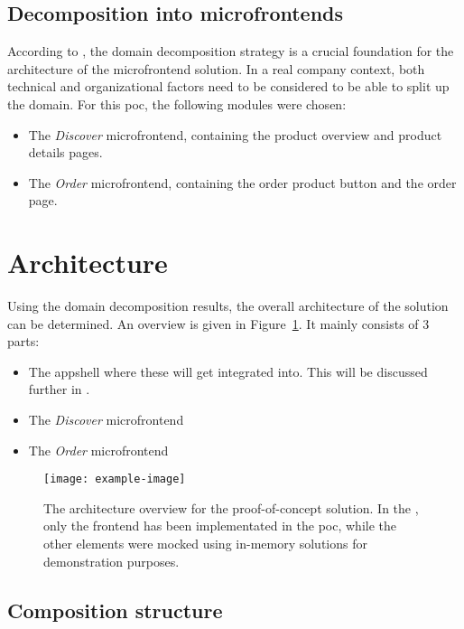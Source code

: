 \subsection{Decomposition into microfrontends}

According to \textcite{Rappl_2021}, the domain decomposition strategy is a
crucial foundation for the architecture of the \gls{microfrontend} solution. In
a real company context, both technical and organizational factors need to be
considered to be able to split up the domain. For this \gls{poc}, the following
modules were chosen:

\begin{itemize}
  \item The \textit{Discover} \gls{microfrontend}, containing the product
  overview and product details pages.
  \item The \textit{Order} \gls{microfrontend}, containing the order product
  button and the order page.
\end{itemize}

\section{Architecture}

Using the domain decomposition results, the overall architecture of the solution
can be determined. An overview is given in Figure~\ref{fig:poc-architecture}. It
mainly consists of 3 parts:
\begin{itemize}
  \item The \gls{appshell} where these 
  will get integrated into. This will be discussed further in
  .
  \item The \textit{Discover} \gls{microfrontend}
  \item The \textit{Order} \gls{microfrontend}
\end{itemize}
 

\begin{figure}
  \centering
  \texttt{[image: example-image]}  %
  \caption[Architecture overview for proof-of-concept solution]{The architecture
  overview for the proof-of-concept solution. In the ,
  only the \gls{frontend} has been implementated in the \gls{poc}, while the
  other elements were mocked using in-memory solutions for demonstration
  purposes.
  }
  \label{fig:poc-architecture}
\end{figure}


\subsection{Composition structure}

